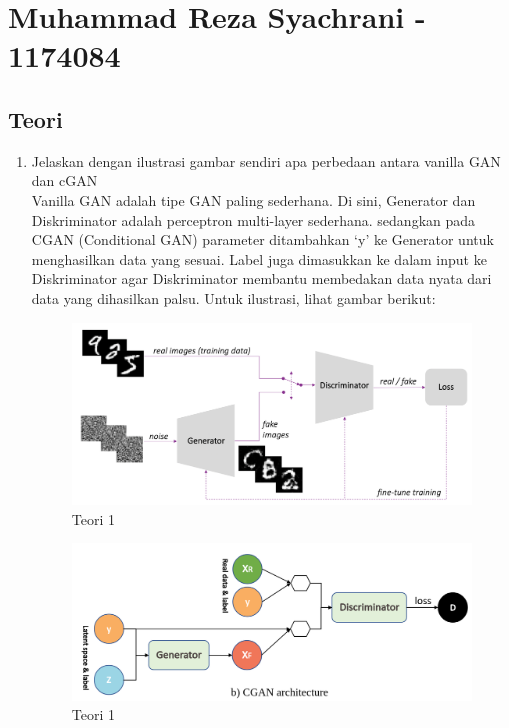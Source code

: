 \section{Muhammad Reza Syachrani - 1174084}
\subsection{Teori}
\begin{enumerate}

	\item Jelaskan dengan ilustrasi gambar sendiri apa perbedaan antara vanilla GAN dan cGAN
	\hfill\\
Vanilla GAN adalah tipe GAN paling sederhana. Di sini, Generator dan Diskriminator adalah perceptron multi-layer sederhana. sedangkan  pada CGAN (Conditional GAN)  parameter ditambahkan ‘y’ ke Generator untuk menghasilkan data yang sesuai. Label juga dimasukkan ke dalam input ke Diskriminator agar Diskriminator membantu membedakan data nyata dari data yang dihasilkan palsu.
Untuk ilustrasi, lihat gambar berikut:

\begin{figure}[H]
    \includegraphics[width=12cm]{figures/1174084/9/teori1.png}
    \centering
    \caption{Teori 1}
\end{figure}
\begin{figure}[H]
    \includegraphics[width=12cm]{figures/1174084/9/teori1_1.png}
    \centering
    \caption{Teori 1}
\end{figure}


\end{enumerate}

